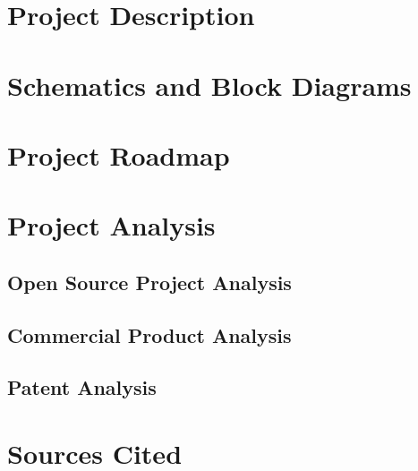 \documentclass[12pt,letterpaper,onecolumn]{article}
\begin{document}


\section[Project Description]{Project Description}

\section[Schematics]{Schematics and Block Diagrams}

\section[Project Roadmap]{Project Roadmap}

\section[Project Analysis]{Project Analysis}

\subsection[Open Source]{Open Source Project Analysis}

\subsection[Commercial]{Commercial Product Analysis}

\subsection[Patent]{Patent Analysis}

\section[Sources Cited]{Sources Cited}
\end{document}

